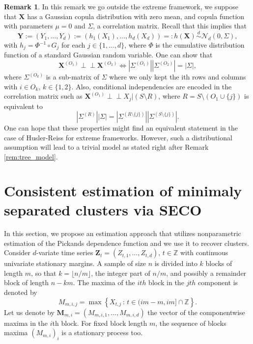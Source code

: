 \documentclass[11pt]{article}
\theoremstyle{definition}
\newtheorem{remark}{Remark}
\newcommand{\indep}{\perp \!\!\! \perp}
\begin{document}
	\begin{remark}
		 \label{rem:gaussian_copula}
		 In this remark we go outside the extreme framework, we suppose that $\textbf{X}$ has a Gaussian copula distribution with zero mean, and copula function with parameters $\mu = 0$ and $\Sigma$, a correlation matrix. Recall that this implies that
		 \begin{equation*}
		 	\textbf{Y} := (Y_1, \dots, Y_d) := (h_1(X_1), \dots, h_d(X_d)) =: h(\textbf{X}) \overset{d}{\sim} \mathcal{N}_d(0, \Sigma),
		 \end{equation*}
		 with $h_j = \Phi^{-1} \circ G_j$ for each $j \in \{1,\dots,d\}$, where $\Phi$ is the cumulative distribution function of a standard Gaussian random variable. One can show that
		 \begin{equation*}
		 	\textbf{X}^{(O_1)} \indep \textbf{X}^{(O_2)} \Longleftrightarrow  |\Sigma^{(O_1)}| |\Sigma^{(O_2)}| = |\Sigma|,
		 \end{equation*}
		 where $\Sigma^{(O_k)}$ is a sub-matrix of $\Sigma$ where we only kept the ith rows and columns with $i \in O_k$, $k \in \{1,2\}$. Also, conditional independencies are encoded in the correlation matrix such as $\textbf{X}^{(O_1)} \indep X_j | (S \setminus R)$, where $R = S \setminus (O_1 \cup \{j\})$ is equivalent to
		 \begin{equation*}
		 	|\Sigma^{(R)}| |\Sigma| = |\Sigma^{(R \setminus \{j\})}| |\Sigma^{(S \setminus \{j\})}|.
		 \end{equation*}
		 One can hope that these properties might find an equivalent statement in the case of Husler-Reiss for extreme frameworks. However, such a distributional assumption will lead to a trivial model as stated right after Remark \ref{rem:tree_model}.
	\end{remark}
	
	\section{Consistent estimation of minimaly separated clusters via SECO}
	\label{sec:estimation}
	In this section, we propose an estimation approach that utilizes nonparametric estimation of the Pickands dependence function and we use it to recover clusters. Consider $d$-variate time series $\textbf{Z}_t = (Z_{t,1},\dots, Z_{t,d})$, $t \in \mathbb{Z}$ with continuous univariate stationary margins. A sample of size $n$ is divided into $k$ blocks of length $m$, so that $k = \lfloor n/m \rfloor$, the integer part of $n/m$, and possibly a remainder block of length $n-km$. The maxima of the $ith$ block in the $jth$ component is denoted by
	\begin{equation*}
		M_{m,i,j} = \max \left\{ X_{t,j} \, : \, t \in (im-m,im] \cap \mathbb{Z} \right\}.
	\end{equation*}
	Let us denote by $\textbf{M}_{m,i} = (M_{m,i,1}, \dots, M_{m,i,d})$ the vector of the componentwise maxima in the $i$th block. For fixed block length $m$, the sequence of blocks maxima $(M_{m,i})_i$ is a stationary process too.
	
\end{document}
